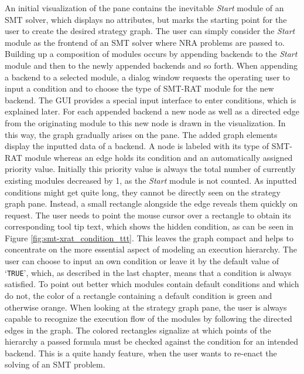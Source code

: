 An initial visualization of the pane contains the inevitable \emph{Start} module of an SMT solver, which displays no attributes, but marks the starting point for the user to create the desired strategy graph. The user can simply consider the \emph{Start} module as the frontend of an SMT solver where NRA problems are passed to. Building up a composition of modules occurs by appending backends to the \emph{Start} module and then to the newly appended backends and so forth. When appending a backend to a selected module, a dialog window requests the operating user to input a condition and to choose the type of SMT-RAT module for the new backend. The GUI provides a special input interface to enter conditions, which is explained later. For each appended backend a new node as well as a directed edge from the originating module to this new node is drawn in the visualization. In this way, the graph gradually arises on the pane. The added graph elements display the inputted data of a backend. A node is labeled with 
its 
type of SMT-RAT module whereas an edge holds its condition and an automatically assigned priority value. Initially this priority value is always the total number of currently existing modules decreased by 1, as the \emph{Start} module is not counted. As inputted conditions might get quite long, they cannot be directly seen on the strategy graph pane. Instead, a small rectangle alongside the edge reveals them quickly on request. The user needs to point the mouse cursor over a rectangle to obtain its corresponding tool tip text, which shows the hidden condition, as can be seen in Figure \ref{fig:smt-xrat_condition_ttt}. This leaves the graph compact and helps to concentrate on the more essential aspect of modeling an execution hierarchy. The user can choose to input an own condition or leave it by the default value of `\texttt{TRUE}', which, as described in the last 
chapter, means that a condition is always satisfied. To point out better which modules contain default conditions and which do not, the color of a rectangle containing a default condition is green and otherwise orange. When looking at the strategy graph pane, the user is always capable to recognize the execution flow of the modules by following the directed edges in the graph. The colored rectangles signalize at which points of the hierarchy a passed formula must be checked against the condition for an intended backend. This is a quite handy feature, when the user wants to re-enact the solving of an SMT problem.

